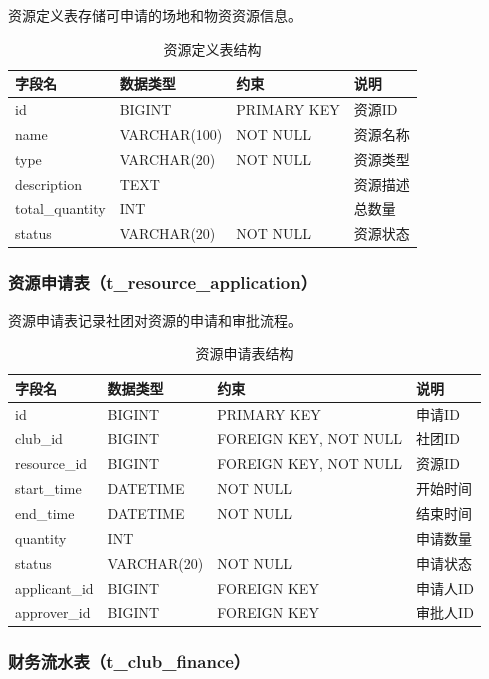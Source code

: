资源定义表存储可申请的场地和物资资源信息。

\begin{table}[H]
\centering
\caption{资源定义表结构}
\begin{tabular}{llll}
\toprule
字段名 & 数据类型 & 约束 & 说明 \\
\midrule
id & BIGINT & PRIMARY KEY & 资源ID \\
name & VARCHAR(100) & NOT NULL & 资源名称 \\
type & VARCHAR(20) & NOT NULL & 资源类型 \\
description & TEXT & & 资源描述 \\
total\_quantity & INT & & 总数量 \\
status & VARCHAR(20) & NOT NULL & 资源状态 \\
\bottomrule
\end{tabular}
\end{table}

\subsubsection{资源申请表（t\_resource\_application）}

资源申请表记录社团对资源的申请和审批流程。

\begin{table}[H]
\centering
\caption{资源申请表结构}
\begin{tabular}{llll}
\toprule
字段名 & 数据类型 & 约束 & 说明 \\
\midrule
id & BIGINT & PRIMARY KEY & 申请ID \\
club\_id & BIGINT & FOREIGN KEY, NOT NULL & 社团ID \\
resource\_id & BIGINT & FOREIGN KEY, NOT NULL & 资源ID \\
start\_time & DATETIME & NOT NULL & 开始时间 \\
end\_time & DATETIME & NOT NULL & 结束时间 \\
quantity & INT & & 申请数量 \\
status & VARCHAR(20) & NOT NULL & 申请状态 \\
applicant\_id & BIGINT & FOREIGN KEY & 申请人ID \\
approver\_id & BIGINT & FOREIGN KEY & 审批人ID \\
\bottomrule
\end{tabular}
\end{table}

\subsubsection{财务流水表（t\_club\_finance）}

